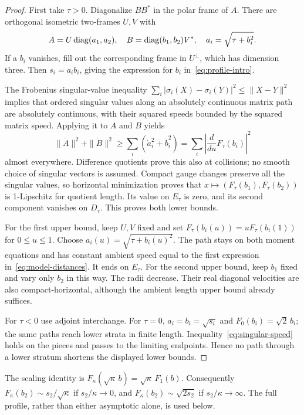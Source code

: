 \begin{proof}
First take $\tau>0$. Diagonalize $BB^*$ in the polar frame of $A$.
There are orthogonal isometric two-frames $U,V$ with
\[
A=U\operatorname{diag}(a_1,a_2),\quad
B=\operatorname{diag}(b_1,b_2)V^*,\quad
a_i=\sqrt{\tau+b_i^2}.
\]
If a $b_i$ vanishes, fill out the corresponding frame in $U^\perp$,
which has dimension three. Then $s_i=a_ib_i$, giving the expression
for $b_i$ in~\eqref{eq:profile-intro}.

The Frobenius singular-value inequality \cite{Mir60}
$\sum_i|\sigma_i(X)-\sigma_i(Y)|^2\le\|X-Y\|^2$
implies that ordered singular values along an absolutely continuous
matrix path are absolutely continuous, with their squared speeds
bounded by the squared matrix speed. Applying it to $A$ and $B$ yields
\begin{equation}\label{eq:singular-speed}
\|\dot A\|^2+\|\dot B\|^2
\ge\sum_i(\dot a_i^2+\dot b_i^2)
=\sum_i\left|\frac{d}{du}F_\tau(b_i)\right|^2
\end{equation}
almost everywhere. Difference quotients prove this also at collisions;
no smooth choice of singular vectors is assumed. Compact gauge changes
preserve all the singular values, so horizontal minimization proves that
$x\mapsto(F_\tau(b_1),F_\tau(b_2))$ is 1-Lipschitz for quotient
length. Its value on $E_\tau$ is zero, and its second component
vanishes on $D_\tau$. This proves both lower bounds.

For the first upper bound, keep $U,V$ fixed and set
$F_\tau(b_i(u))=uF_\tau(b_i(1))$ for $0\le u\le1$.
Choose $a_i(u)=\sqrt{\tau+b_i(u)^2}$. The path stays on both moment
equations and has constant ambient speed equal to the first expression
in~\eqref{eq:model-distances}. It ends on $E_\tau$. For the second
upper bound, keep $b_1$ fixed and vary only $b_2$ in this way.
The radii decrease. Their real diagonal velocities are also
compact-horizontal, although the ambient length upper bound already
suffices.

For $\tau<0$ use adjoint interchange. For $\tau=0$, $a_i=b_i=\sqrt{s_i}$
and $F_0(b_i)=\sqrt2\,b_i$; the same paths reach lower strata in
finite length. Inequality~\eqref{eq:singular-speed} holds on the
pieces and passes to the limiting endpoints. Hence no path through a
lower stratum shortens the displayed lower bounds.
\end{proof}

The scaling identity is $F_\kappa(\sqrt\kappa\,b)=\sqrt\kappa\,F_1(b)$.
Consequently $F_\kappa(b_2)\sim s_2/\sqrt\kappa$ if $s_2/\kappa\to0$,
and $F_\kappa(b_2)\sim\sqrt{2s_2}$ if $s_2/\kappa\to\infty$.
The full profile, rather than either asymptotic alone, is used below.

